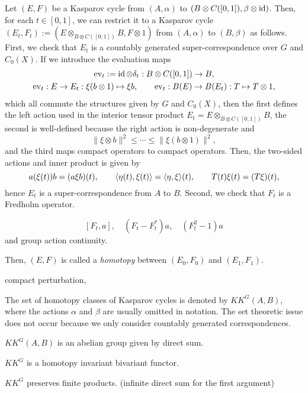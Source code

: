 \documentclass{../../large}
\begin{document}
\begin{prb}[KK-groups]
Let $(E,F)$ be a Kasparov cycle from $(A,\alpha)$ to $(B\otimes C([0,1]),\beta\otimes\operatorname{id})$.
Then, for each $t\in[0,1]$, we can restrict it to a Kasparov cycle $(E_t,F_t):=(E\otimes_{B\otimes C([0,1])}B,F\otimes1)$ from $(A,\alpha)$ to $(B,\beta)$ as follows.
First, we check that $E_t$ is a countably generated super-correspondence over $G$ and $C_0(X)$.
If we introduce the evaluation maps
\begin{gather*}
\mathrm{ev}_t:=\operatorname{id}\otimes\delta_t:B\otimes C([0,1])\to B,\\
\mathrm{ev}_t:E\to E_t:\xi(b\otimes1)\mapsto\xi b,\qquad\mathrm{ev}_t:B(E)\to B(E_t):T\mapsto T\otimes1,
\end{gather*}
which all commute the structures given by $G$ and $C_0(X)$, then the first defines the left action used in the interior tensor product $E_t=E\otimes_{B\otimes C([0,1])}B$, the second is well-defined because the right action is non-degenerate and
\[\|\xi\otimes b\|^2\le\cdots\le\|\xi(b\otimes1)\|^2,\]
and the third maps compact operators to compact operators.
Then, the two-sided actions and inner product is given by
\[a(\xi(t))b=(a\xi b)(t),\qquad\langle\eta(t),\xi(t)\rangle=\langle\eta,\xi\rangle(t),\qquad T(t)\xi(t)=(T\xi)(t),\]
hence $E_t$ is a super-correspondence from $A$ to $B$.
Second, we check that $F_t$ is a Fredholm operator.

\[[F_t,a],\quad (F_t-F_t^*)a,\quad (F_t^2-1)a\]
and group action continuity.

Then, $(E,F)$ is called a \emph{homotopy} between $(E_0,F_0)$ and $(E_1,F_1)$.


compact perturbation, 




The set of homotopy classes of Kasparov cycles is denoted by $KK^G(A,B)$, where the actions $\alpha$ and $\beta$ are usually omitted in notation.
The set theoretic issue does not occur because we only consider countably generated correspondences.

\begin{parts}
\item $KK^G(A,B)$ is an abelian group given by direct sum.
\item $KK^G$ is a homotopy invariant bivariant functor.
\item $KK^G$ preserves finite products. (infinite direct sum for the first argument)
\end{parts}
\end{prb}
\end{document}
